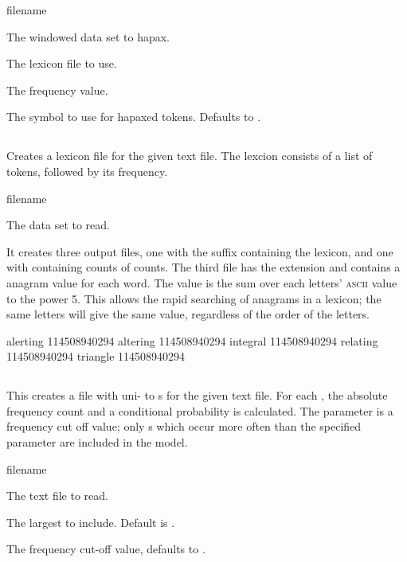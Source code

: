 \documentclass[a4paper,10pt,twoside]{report}
\begin{document}
\begin{varlist}{filename}
\item[filename] The windowed data set to hapax.
\item[lexicon] The lexicon file to use.
\item[hpx] The frequency value.
\item[hpx\_sym] The symbol to use for hapaxed tokens. Defaults to
  . 
\end{varlist}

\subsection{}

Creates a lexicon file for the given text file. The lexcion consists
of a list of tokens, followed by its frequency.

\begin{varlist}{filename}
\item[filename] The data set to read.
\end{varlist}

It creates three output files, one with the suffix 
containing the lexicon, and one with  containing counts of
counts. The third file has the extension  and contains a
anagram value for each word. The value is the sum over each letters'
\textsc{ascii} value to the power 5. This allows the rapid searching
of anagrams in a lexicon; the same letters will give the same value,
regardless of the order of the letters.

\begin{wout}{}
alerting 114508940294
altering 114508940294
integral 114508940294
relating 114508940294
triangle 114508940294
\end{wout}

\subsection{}

This creates a file with uni- to \ngram{}s for the given text
file. For each \ngram{}, the absolute frequency count and a
conditional probability is calculated. The  parameter is a
frequency cut off value; only \ngram{}s which occur more often than
the specified  parameter are included in the model.

\begin{varlist}{filename}
\item[filename] The text file to read.
\item[n] The largest \ngram{} to include. Default is .
\item[fco] The frequency cut-off value, defaults to .
\end{varlist}
\end{document}
